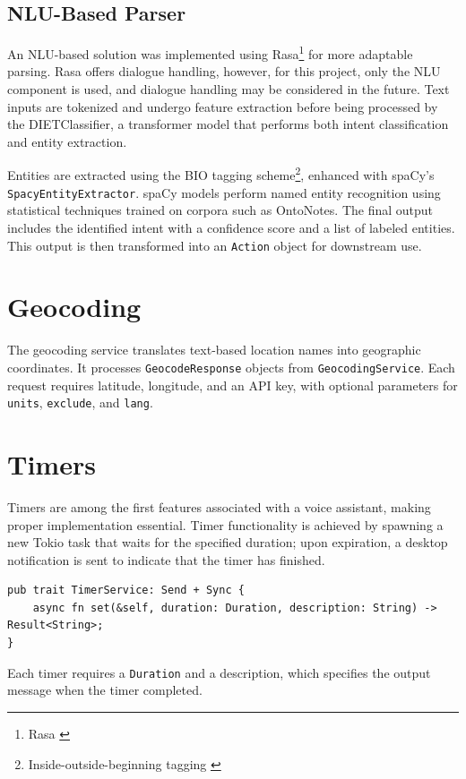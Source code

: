 \subsection{NLU-Based Parser}
An NLU-based solution was implemented using Rasa\footnote{Rasa \cite{rasa}} for more adaptable parsing.
Rasa offers dialogue handling, however, for this project, only the NLU component is used,
and dialogue handling may be considered in the future.
Text inputs are tokenized and undergo feature extraction before being processed by the DIETClassifier,
a transformer model that performs both intent classification and entity extraction.

Entities are extracted using the BIO tagging scheme\footnote{Inside-outside-beginning tagging \cite{bio}},
enhanced with spaCy's \texttt{SpacyEntityExtractor}.
spaCy models perform named entity recognition using statistical techniques trained on corpora such as OntoNotes.
The final output includes the identified intent with a confidence score and a list of labeled entities.
This output is then transformed into an \texttt{Action} object for downstream use.

\section{Geocoding}
The geocoding service translates text-based location names into geographic coordinates.
It processes \texttt{GeocodeResponse} objects from \texttt{GeocodingService}.
Each request requires latitude, longitude, and an API key, with optional parameters for \texttt{units}, \texttt{exclude}, and \texttt{lang}.

\section{Timers}
Timers are among the first features associated with a voice assistant, making proper implementation essential.
Timer functionality is achieved by spawning a new Tokio task that waits for the specified duration;
upon expiration, a desktop notification is sent to indicate that the timer has finished.

\begin{verbatim}
pub trait TimerService: Send + Sync {
    async fn set(&self, duration: Duration, description: String) -> Result<String>;
}
\end{verbatim}
Each timer requires a \texttt{Duration} and a description,
which specifies the output message when the timer completed.

